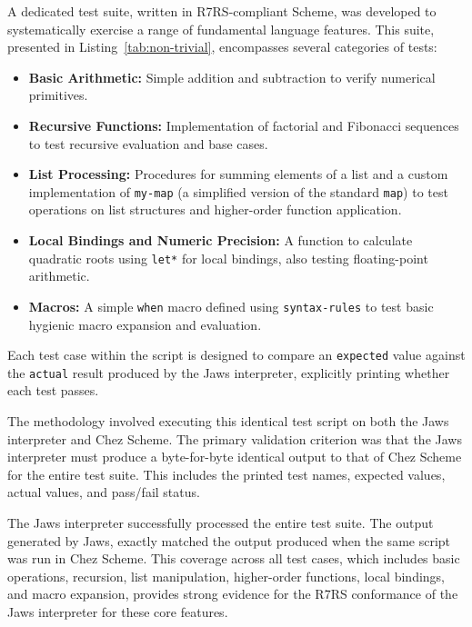 \documentclass[final]{cmpreport_02}
\begin{document}
A dedicated test suite, written in R7RS-compliant Scheme, was developed to systematically exercise a range of fundamental language features. This suite, presented in Listing~\ref{tab:non-trivial}, encompasses several categories of tests:
\begin{itemize}[noitemsep]
    \item \textbf{Basic Arithmetic:} Simple addition and subtraction to verify numerical primitives.
    \item \textbf{Recursive Functions:} Implementation of factorial and Fibonacci sequences to test recursive evaluation and base cases.
    \item \textbf{List Processing:} Procedures for summing elements of a list and a custom implementation of \texttt{my-map} (a simplified version of the standard \texttt{map}) to test operations on list structures and higher-order function application.
    \item \textbf{Local Bindings and Numeric Precision:} A function to calculate quadratic roots using \texttt{let*} for local bindings, also testing floating-point arithmetic.
    \item \textbf{Macros:} A simple \texttt{when} macro defined using \texttt{syntax-rules} to test basic hygienic macro expansion and evaluation.
\end{itemize}
Each test case within the script is designed to compare an \texttt{expected} value against the \texttt{actual} result produced by the Jaws interpreter, explicitly printing whether each test passes.\newline

The methodology involved executing this identical test script on both the Jaws interpreter and Chez Scheme. The primary validation criterion was that the Jaws interpreter must produce a byte-for-byte identical output to that of Chez Scheme for the entire test suite. This includes the printed test names, expected values, actual values, and pass/fail status.\newline

The Jaws interpreter successfully processed the entire test suite. The output generated by Jaws, exactly matched the output produced when the same script was run in Chez Scheme. This coverage across all test cases, which includes basic operations, recursion, list manipulation, higher-order functions, local bindings, and macro expansion, provides strong evidence for the R7RS conformance of the Jaws interpreter for these core features.\newline
\end{document}
